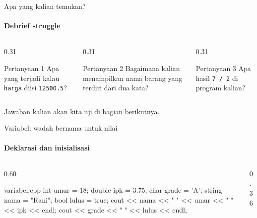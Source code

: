 \documentclass[t]{beamer}
\begin{document}
\begin{frame}{Apa yang kalian temukan?}
\framesubtitle{Debrief struggle}
\begin{columns}[T]
\begin{column}{0.31\textwidth}
\begin{BlokGelap}{Pertanyaan 1}
Apa yang terjadi kalau \texttt{harga} diisi \texttt{12500.5}?
\end{BlokGelap}
\end{column}
\begin{column}{0.31\textwidth}
\begin{BlokGelap}{Pertanyaan 2}
Bagaimana kalian menampilkan nama barang yang terdiri dari dua kata?
\end{BlokGelap}
\end{column}
\begin{column}{0.31\textwidth}
\begin{BlokGelap}{Pertanyaan 3}
Apa hasil \texttt{7 / 2} di program kalian?
\end{BlokGelap}
\end{column}
\end{columns}
\vspace{10pt}
Jawaban kalian akan kita uji di bagian berikutnya.
\end{frame}


\begin{frame}[fragile]{Variabel: wadah bernama untuk nilai}
\framesubtitle{Deklarasi dan inisialisasi}
\begin{columns}[T]
\begin{column}{0.60\textwidth}
\begin{Kode}[listing options={style=ITERACodeKecil}]{variabel.cpp}
int umur = 18;
double ipk = 3.75;
char grade = 'A';
string nama = "Rani";
bool lulus = true;
cout << nama << " " << umur << " " << ipk << endl;
cout << grade << " " << lulus << endl;
\end{Kode}
\end{column}
\begin{column}{0.36\textwidth}
\end{column}
\end{columns}
\end{frame}
\end{document}
